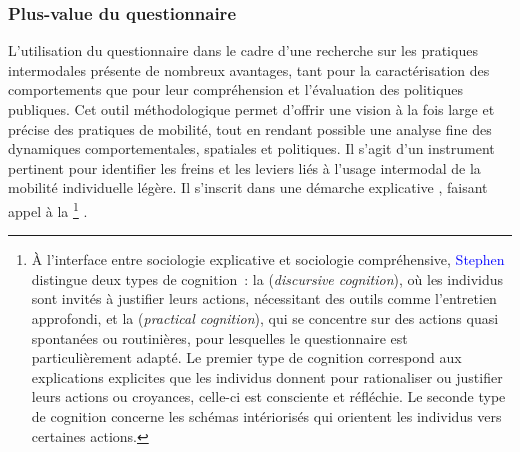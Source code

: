 \begin{refsegment}
\subsubsection*{Plus-value du questionnaire
    \label{chap3:apports-questionnaire-usagers-plus-value}
    }

L’utilisation du questionnaire dans le cadre d’une recherche sur les pratiques intermodales présente de nombreux avantages, tant pour la caractérisation des comportements que pour leur compréhension et l’évaluation des politiques publiques. Cet outil méthodologique permet d’offrir une vision à la fois large et précise des pratiques de mobilité, tout en rendant possible une analyse fine des dynamiques comportementales, spatiales et politiques. Il s'agit d'un instrument pertinent pour identifier les freins et les leviers liés à l’usage intermodal de la mobilité individuelle légère. Il s’inscrit dans une démarche explicative \textcolor{blue}{\autocite[20]{singly_questionnaire_2016}}, faisant appel à la \footnote{ 
    À l’interface entre sociologie explicative et sociologie compréhensive, \textcolor{blue}{Stephen} \textcolor{blue}{\textcite[1~683]{vaisey_motivation_2009}} distingue deux types de cognition~: la  (\textsl{discursive cognition}), où les individus sont invités à justifier leurs actions, nécessitant des outils comme l’entretien approfondi, et la  (\textsl{practical cognition}), qui se concentre sur des actions quasi spontanées ou routinières, pour lesquelles le questionnaire est particulièrement adapté. Le premier type de cognition correspond aux explications explicites que les individus donnent pour rationaliser ou justifier leurs actions ou croyances, celle-ci est consciente et réfléchie. Le seconde type de cognition concerne les schémas intériorisés qui orientent les individus vers certaines actions.
} \textcolor{blue}{\autocite[1~683]{vaisey_motivation_2009}}.%


\end{refsegment}
